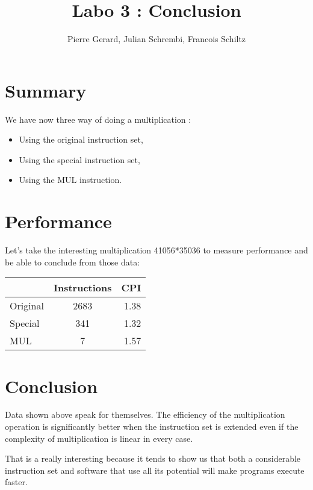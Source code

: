 \documentclass[a4paper]{article}
\title{Labo 3 : Conclusion}
\author{Pierre Gerard, Julian Schrembi, Francois Schiltz}
\begin{document}
\maketitle

\section{Summary}

We have now three way of doing a multiplication :
\begin{itemize}
	\item Using the original instruction set,
	\item Using the special instruction set,
	\item Using the MUL instruction.
\end{itemize}

\section{Performance}

Let's take the interesting multiplication 41056*35036 to measure performance and be able to conclude from those data:

\begin{center}
  \begin{tabular}{ | l | c | r |}
    \hline
     & Instructions & CPI \\ \hline
    Original & 2683 & 1.38 \\ \hline
    Special & 341 & 1.32 \\ \hline
    MUL & 7 & 1.57 \\
    \hline
  \end{tabular}
\end{center}

\section{Conclusion}
Data shown above speak for themselves. The efficiency of the multiplication operation is significantly better when the instruction set is extended even if the complexity of multiplication is linear in every case.

That is a really interesting because it tends to show us that both a considerable instruction set and software that use all its potential will make programs execute faster.
\end{document}
